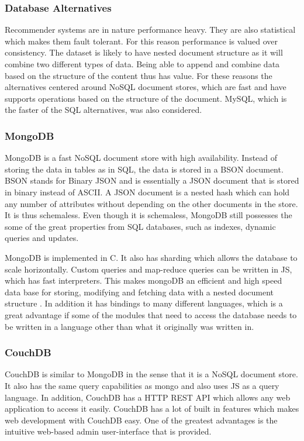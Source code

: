 \subsubsection{Database Alternatives}
Recommender systems are in nature performance heavy. They are also statistical which makes them fault tolerant. For this reason performance is valued over consistency. The dataset is likely to have nested document structure as it will combine two different types of data. Being able to append and combine data based on the structure of the content thus has value.
For these reasons the alternatives centered around NoSQL document stores, which are fast and have supports operations based on the structure of the document.
MySQL, which is the faster of the SQL alternatives, was also considered.

\subsubsection*{MongoDB}
MongoDB is a fast NoSQL document store with high availability. Instead of storing the data in tables as in SQL, the data is stored in a BSON document. BSON stands for Binary JSON and is essentially a JSON document that is stored in binary instead of ASCII. A JSON document is a nested hash which can hold any number of attributes without depending on the other documents in the store. It is thus schemaless. Even though it is schemaless, MongoDB still possesses the some of the great properties from SQL databases, such as indexes, dynamic queries and updates.

MongoDB is implemented in C. It also has sharding which allows the database to scale horizontally. Custom queries and map-reduce queries can be written in JS, which has fast interpreters. This makes mongoDB an efficient and high speed data base for storing, modifying and fetching data with a nested document structure \cite{mongodb-intro}. In addition it has bindings to many different languages, which is a great advantage if some of the modules that need to access the database needs to be written in a language other than what it originally was written in.


\subsubsection*{CouchDB}
CouchDB is similar to MongoDB in the sense that it is a NoSQL document store. It also has the same query capabilities as mongo and also uses JS as a query language. In addition, CouchDB has a HTTP REST API which allows any web application to access it easily. CouchDB has a lot of built in features which makes web development with CouchDB easy. One of the greatest advantages is the intuitive web-based admin user-interface that is provided.

